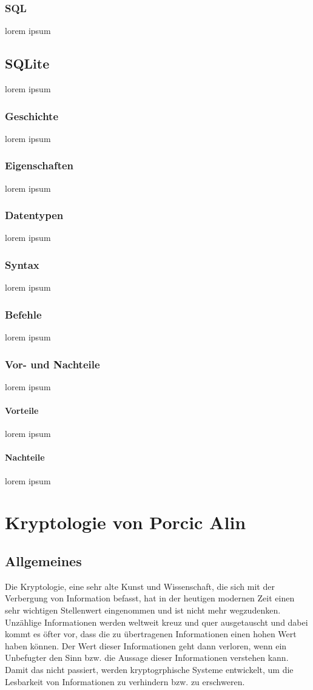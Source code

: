 \documentclass[11pt,a4paper]{report}
\begin{document}
\subsection{SQL}
lorem ipsum
\section{SQLite}
lorem ipsum
\subsection{Geschichte}
lorem ipsum
\subsection{Eigenschaften}
lorem ipsum
\subsection{Datentypen}
lorem ipsum
\subsection{Syntax}
lorem ipsum 
\subsection{Befehle}
lorem ipsum
\subsection{Vor- und Nachteile}
lorem ipsum
\subsubsection{Vorteile}
lorem ipsum
\subsubsection{Nachteile}
lorem ipsum

\chapter{Kryptologie von Porcic Alin}
\section{Allgemeines}

Die Kryptologie, eine sehr alte Kunst und Wissenschaft, die sich mit der Verbergung von Information befasst, hat in der heutigen modernen Zeit einen sehr wichtigen Stellenwert eingenommen und ist nicht mehr wegzudenken. Unzählige Informationen werden weltweit kreuz und quer ausgetauscht und dabei kommt es öfter vor, dass die zu übertragenen Informationen einen hohen Wert haben können. Der Wert dieser Informationen geht dann verloren, wenn ein Unbefugter den Sinn bzw. die Aussage dieser Informationen verstehen kann. Damit das nicht passiert, werden kryptogrphische Systeme entwickelt, um die Lesbarkeit von Informationen zu verhindern bzw. zu erschweren.\\\\
\end{document}
